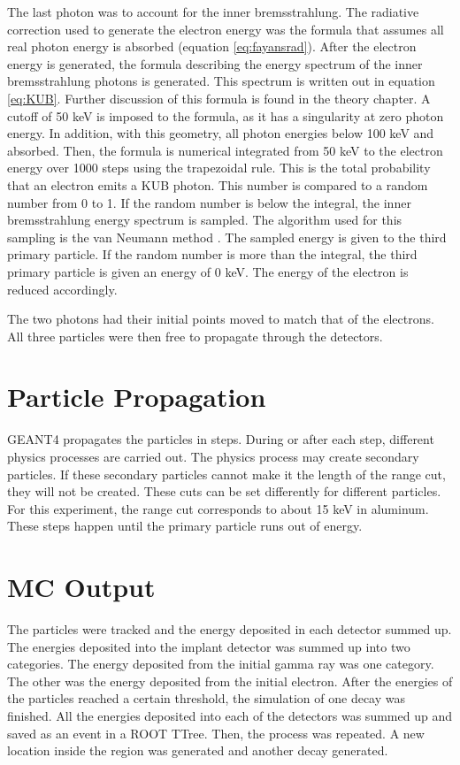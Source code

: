 \documentclass[../MaxHughesThesis.tex]{subfiles}
\begin{document}
The last photon was to account for the inner bremsstrahlung.
The radiative correction used to generate the electron energy was the formula that assumes all real photon energy is absorbed (equation \ref{eq:fayansrad}).
After the electron energy is generated, the formula describing the energy spectrum of the inner bremsstrahlung photons is generated. 
This spectrum is written out in equation \ref{eq:KUB}. %
Further discussion of this formula is found in the theory chapter.
A cutoff of 50 keV is imposed to the formula, as it has a singularity at zero photon energy.
In addition, with this geometry, all photon energies below 100 keV and absorbed.
Then, the formula is numerical integrated from 50 keV to the electron energy over 1000 steps using the trapezoidal rule.
This is the total probability that an electron emits a KUB photon.
This number is compared to a random number from 0 to 1.
If the random number is below the integral, the inner bremsstrahlung energy spectrum is sampled.
The algorithm used for this sampling is the van Neumann method \cite{neu51}.
The sampled energy is given to the third primary particle.
If the random number is more than the integral, the third primary particle is given an energy of 0 keV.
The energy of the electron is reduced accordingly.

The two photons had their initial points moved to match that of the electrons.
All three particles were then free to propagate through the detectors.

\section{Particle Propagation}  
GEANT4 propagates the particles in steps.
During or after each step, different physics processes are carried out.
The physics process may create secondary particles.
If these secondary particles cannot make it the length of the range cut, they will not be created.
These cuts can be set differently for different particles.
For this experiment, the range cut corresponds to about 15 keV in aluminum.
These steps happen until the primary particle runs out of energy.

\section{MC Output}
The particles were tracked and the energy deposited in each detector summed up.
The energies deposited into the implant detector was summed up into two categories.
The energy deposited from the initial gamma ray was one category.
The other was the energy deposited from the initial electron.
After the energies of the particles reached a certain threshold, the simulation of one decay was finished.
All the energies deposited into each of the detectors was summed up and saved as an event in a ROOT TTree.
Then, the process was repeated.
A new location inside the region was generated and another decay generated.
\end{document}
